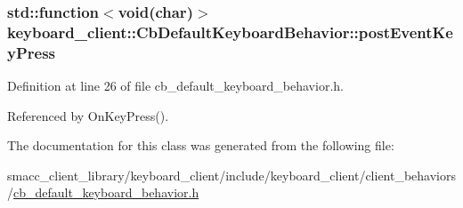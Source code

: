 \subsubsection[{\texorpdfstring{post\+Event\+Key\+Press}{postEventKeyPress}}]{\setlength{\rightskip}{0pt plus 5cm}std\+::function$<$void(char)$>$ keyboard\+\_\+client\+::\+Cb\+Default\+Keyboard\+Behavior\+::post\+Event\+Key\+Press}\hypertarget{classkeyboard__client_1_1CbDefaultKeyboardBehavior_ac3a5e8c2cca0fd4117ddc192858d3771}{}\label{classkeyboard__client_1_1CbDefaultKeyboardBehavior_ac3a5e8c2cca0fd4117ddc192858d3771}


Definition at line 26 of file cb\+\_\+default\+\_\+keyboard\+\_\+behavior.\+h.



Referenced by On\+Key\+Press().



The documentation for this class was generated from the following file\+:\begin{DoxyCompactItemize}
\item 
smacc\+\_\+client\+\_\+library/keyboard\+\_\+client/include/keyboard\+\_\+client/client\+\_\+behaviors/\hyperlink{cb__default__keyboard__behavior_8h}{cb\+\_\+default\+\_\+keyboard\+\_\+behavior.\+h}\end{DoxyCompactItemize}
